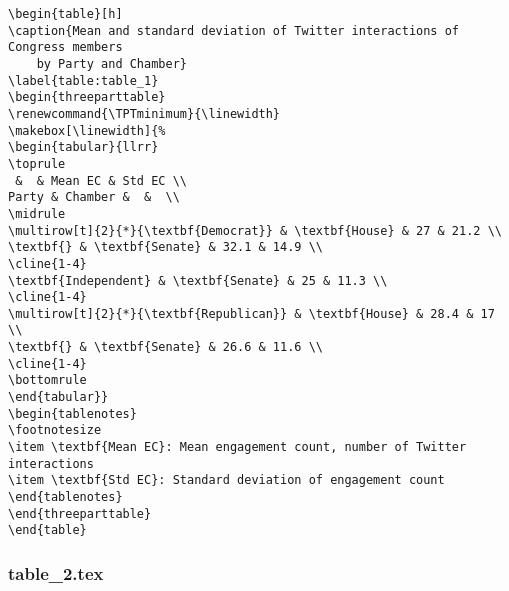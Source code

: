 \documentclass[11pt]{article}
\begin{document}
\begin{Verbatim}[tabsize=4]
\begin{table}[h]
\caption{Mean and standard deviation of Twitter interactions of Congress members
	by Party and Chamber}
\label{table:table_1}
\begin{threeparttable}
\renewcommand{\TPTminimum}{\linewidth}
\makebox[\linewidth]{%
\begin{tabular}{llrr}
\toprule
 &  & Mean EC & Std EC \\
Party & Chamber &  &  \\
\midrule
\multirow[t]{2}{*}{\textbf{Democrat}} & \textbf{House} & 27 & 21.2 \\
\textbf{} & \textbf{Senate} & 32.1 & 14.9 \\
\cline{1-4}
\textbf{Independent} & \textbf{Senate} & 25 & 11.3 \\
\cline{1-4}
\multirow[t]{2}{*}{\textbf{Republican}} & \textbf{House} & 28.4 & 17 \\
\textbf{} & \textbf{Senate} & 26.6 & 11.6 \\
\cline{1-4}
\bottomrule
\end{tabular}}
\begin{tablenotes}
\footnotesize
\item \textbf{Mean EC}: Mean engagement count, number of Twitter interactions
\item \textbf{Std EC}: Standard deviation of engagement count
\end{tablenotes}
\end{threeparttable}
\end{table}

\end{Verbatim}

\subsubsection*{table\_2.tex}
\end{document}
